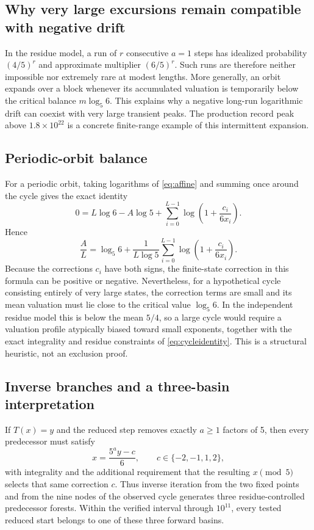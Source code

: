 \documentclass[11pt]{article}
\begin{document}
\subsection*{Why very large excursions remain compatible with negative drift}
In the residue model, a run of $r$ consecutive $a=1$ steps has idealized probability $(4/5)^r$ and approximate multiplier $(6/5)^r$. Such runs are therefore neither impossible nor extremely rare at modest lengths. More generally, an orbit expands over a block whenever its accumulated valuation is temporarily below the critical balance $m\log_5 6$. This explains why a negative long-run logarithmic drift can coexist with very large transient peaks. The production record peak above $1.8\times10^{22}$ is a concrete finite-range example of this intermittent expansion.

\subsection*{Periodic-orbit balance}
For a periodic orbit, taking logarithms of \eqref{eq:affine} and summing once around the cycle gives the exact identity
\begin{equation}
0=L\log6-A\log5+\sum_{i=0}^{L-1}\log\!\left(1+\frac{c_i}{6x_i}\right).
\end{equation}
Hence
\begin{equation}
\frac{A}{L}=\log_5 6+\frac{1}{L\log5}\sum_{i=0}^{L-1}\log\!\left(1+\frac{c_i}{6x_i}\right).
\end{equation}
Because the corrections $c_i$ have both signs, the finite-state correction in this formula can be positive or negative. Nevertheless, for a hypothetical cycle consisting entirely of very large states, the correction terms are small and its mean valuation must lie close to the critical value $\log_5 6$. In the independent residue model this is below the mean $5/4$, so a large cycle would require a valuation profile atypically biased toward small exponents, together with the exact integrality and residue constraints of \eqref{eq:cycleidentity}. This is a structural heuristic, not an exclusion proof.

\subsection*{Inverse branches and a three-basin interpretation}
If $T(x)=y$ and the reduced step removes exactly $a\ge1$ factors of 5, then every predecessor must satisfy
\begin{equation}
x=\frac{5^a y-c}{6},\qquad c\in\{-2,-1,1,2\},
\end{equation}
with integrality and the additional requirement that the resulting $x\pmod5$ selects that same correction $c$. Thus inverse iteration from the two fixed points and from the nine nodes of the observed cycle generates three residue-controlled predecessor forests. Within the verified interval through $10^{11}$, every tested reduced start belongs to one of these three forward basins.
\end{document}
